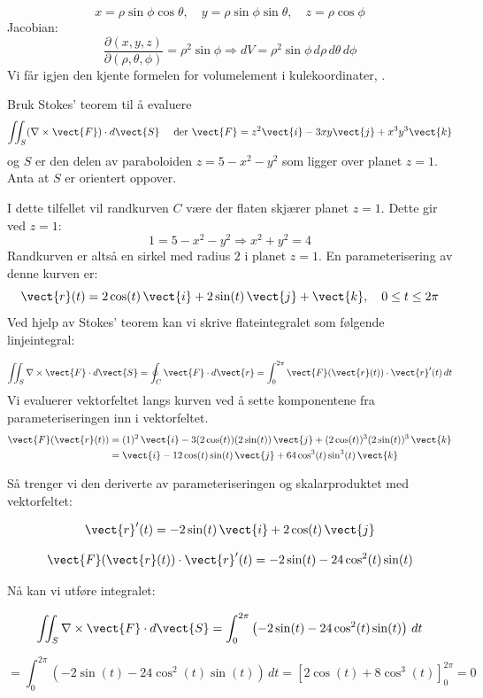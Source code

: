 \begin{ex}[Kulekoordinater]
\[
x = \rho\sin\phi\cos\theta,\quad y = \rho\sin\phi\sin\theta,\quad z = \rho\cos\phi
\]
Jacobian:
\[
\frac{\partial(x, y, z)}{\partial(\rho, \theta, \phi)} = \rho^2\sin\phi \Rightarrow dV = \rho^2\sin\phi\, d\rho\, d\theta\, d\phi
\]
Vi får igjen den kjente formelen for volumelement i kulekoordinater, .
\end{ex}

\begin{ex}
Bruk Stokes’ teorem til å evaluere
\[
\iint_S (\nabla \times \vect{F}) \cdot d\vect{S} \quad 
\text{ der } \vect{F} = z^2 \vect{i} - 3xy \vect{j} + x^3 y^3 \vect{k}
\]
og $S$ er den delen av paraboloiden $z = 5 - x^2 - y^2$ som ligger over planet $z = 1$. Anta at $S$ er orientert oppover.

I dette tilfellet vil randkurven $C$ være der flaten skjærer planet $z = 1$. Dette gir ved $z = 1$:
\[
1 = 5 - x^2 - y^2 \Rightarrow x^2 + y^2 = 4
\]
 Randkurven er altså en sirkel med radius $2$ i planet $z = 1$. En parameterisering av denne kurven er:
\[
\vect{r}(t) = 2\cos(t)\, \vect{i} + 2\sin(t)\, \vect{j} + \vect{k}, \quad 0 \leq t \leq 2\pi
\]
Ved hjelp av Stokes’ teorem kan vi skrive flateintegralet som følgende linjeintegral:

\[
\iint_S \nabla \times \vect{F} \cdot d\vect{S} = \oint_C \vect{F} \cdot d\vect{r} = \int_0^{2\pi} \vect{F}(\vect{r}(t)) \cdot \vect{r}'(t)\, dt
\]
Vi evaluerer vektorfeltet langs kurven ved å sette komponentene fra parameteriseringen inn i vektorfeltet.
\begin{align*}
\vect{F}(\vect{r}(t)) &= (1)^2\, \vect{i} - 3(2\cos(t))(2\sin(t))\, \vect{j} + (2\cos(t))^3 (2\sin(t))^3\, \vect{k}
\\ 
&= \vect{i} - 12\cos(t)\sin(t)\, \vect{j} + 64\cos^3(t)\sin^3(t)\, \vect{k}
\end{align*}

Så trenger vi den deriverte av parameteriseringen og skalarproduktet med vektorfeltet:

\[
\vect{r}'(t) = -2\sin(t)\, \vect{i} + 2\cos(t)\, \vect{j}
\]

\[
\vect{F}(\vect{r}(t)) \cdot \vect{r}'(t) = -2\sin(t) - 24\cos^2(t)\sin(t)
\]

Nå kan vi utføre integralet:

\[
\iint_S \nabla \times \vect{F} \cdot d\vect{S} = \int_0^{2\pi} \left( -2\sin(t) - 24\cos^2(t)\sin(t) \right)\, dt
\]

\[
= \int_0^{2\pi} \left( -2\sin(t) - 24\cos^2(t)\sin(t) \right)\, dt
= \left[ 2\cos(t) + 8\cos^3(t) \right]_0^{2\pi} = 0
\]
\end{ex}

